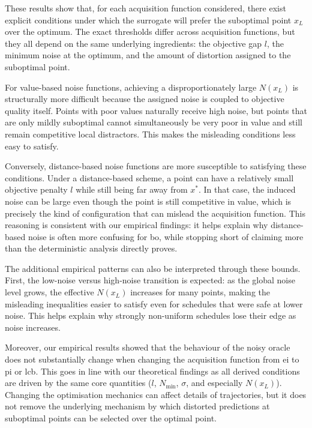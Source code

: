 These results show that, for each acquisition function considered, there exist explicit conditions under which the surrogate will prefer the suboptimal point $x_L$ over the optimum. The exact thresholds differ across acquisition functions, but they all depend on the same underlying ingredients: the objective gap $l$, the minimum noise at the optimum, and the amount of distortion assigned to the suboptimal point.

For value-based noise functions, achieving a disproportionately large $N(x_L)$ is structurally more difficult because the assigned noise is coupled to objective quality itself. Points with poor values naturally receive high noise, but points that are only mildly suboptimal cannot simultaneously be very poor in value and still remain competitive local distractors. This makes the misleading conditions less easy to satisfy.

Conversely, distance-based noise functions are more susceptible to satisfying these conditions. Under a distance-based scheme, a point can have a relatively small objective penalty $l$ while still being far away from $x^*$. In that case, the induced noise can be large even though the point is still competitive in value, which is precisely the kind of configuration that can mislead the acquisition function. This reasoning is consistent with our empirical findings: it helps explain why distance-based noise is often more confusing for \gls{bo}, while stopping short of claiming more than the deterministic analysis directly proves.

The additional empirical patterns can also be interpreted through these bounds. First, the low-noise versus high-noise transition is expected: as the global noise level grows, the effective $N(x_L)$ increases for many points, making the misleading inequalities easier to satisfy even for schedules that were safe at lower noise. This helps explain why strongly non-uniform schedules lose their edge as noise increases.

Moreover, our empirical results showed that the behaviour of the noisy oracle does not substantially change when changing the acquisition function from \gls{ei} to \gls{pi} or \gls{lcb}. This goes in line with our theoretical findings as all derived conditions are driven by the same core quantities ($l$, $N_{\min}$, $\sigma$, and especially $N(x_L)$). Changing the optimisation mechanics can affect details of trajectories, but it does not remove the underlying mechanism by which distorted predictions at  suboptimal points can be selected over the optimal point.

